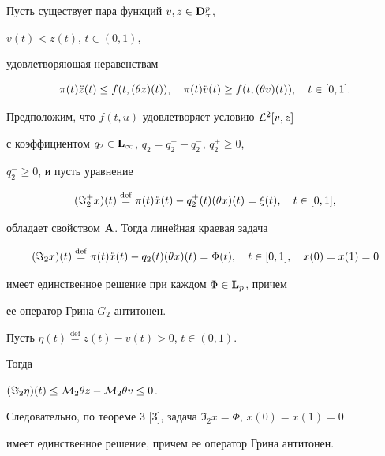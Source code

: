 \begin{lem}


Пусть существует пара функций $v,z\in\bold D_\pi^p$,


$v(t)< z(t)$, $t\in(0,1)$,


удовлетворяющая неравенствам


$$


\pi (t)\Ddot{z}(t)\le f(t,(\theta z)(t)),\quad


\pi (t)\Ddot{v}(t)\ge f(t,(\theta v)(t)),\quad


t\in [0,1].


$$


Предположим, что $f(t,u)$ удовлетворяет условию ${\cal L}^2[v,z]$


с коэффициентом $q_2\in\bold L_\infty$, $q_2=q_2^+-q_2^-$, $q_2^+\ge 0$,


$q_2^-\ge 0$, и пусть уравнение


$$


({\Im}_2^+x)(t)\overset{\mathrm{def}}{=}{}


\pi (t)\Ddot{x}(t)-q_2^+(t)(\theta x)(t)=\xi(t),\quad


t\in[0,1],


$$


обладает свойством $\bold A$. Тогда линейная краевая задача


$$


({\Im}_2x)(t)\overset{\mathrm{def}}{=}{}


\pi (t)\Ddot{x}(t)-q_2(t)(\theta x)(t)=\Phi(t),\quad


t\in[0,1],\quad x(0)=x(1)=0


$$


имеет единственное решение при каждом $\Phi\in\bold L_p$, причем


ее оператор Грина $G_2$ антитонен.


\end{lem}





\begin{pf}


Пусть $\eta(t)\overset{\mathrm{def}}{=}{}z(t)-v(t)> 0$, $t\in (0,1)$.


Тогда


$({\Im}_2\eta)(t)\le {\cal M}_2\theta z-{\cal M}_2\theta v\le 0$.


Следовательно, по теореме 3 [3], задача ${\Im}_2x=\Phi$, $x(0)=x(1)=0$


имеет единственное решение, причем ее оператор Грина антитонен.


\end{pf}





